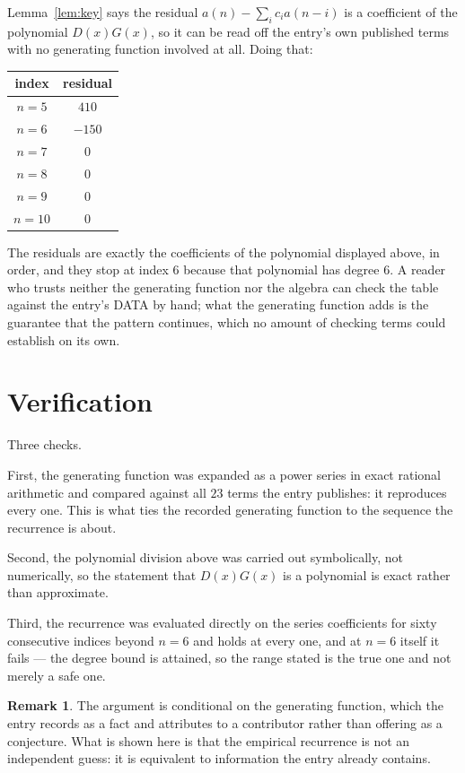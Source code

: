 \documentclass[11pt,a4paper]{article}
\theoremstyle{plain}
\theoremstyle{definition}
\newtheorem{remark}[theorem]{Remark}
\begin{document}
Lemma~\ref{lem:key} says the residual $a(n)-\sum_ic_ia(n-i)$ is a coefficient of the
polynomial $D(x)G(x)$, so it can be read off the entry's own published terms with no
generating function involved at all. Doing that:
\begin{center}
\begin{tabular}{cc}
index & residual \\ \hline
$n=5$ & $410$ \\
$n=6$ & $-150$ \\
$n=7$ & $0$ \\
$n=8$ & $0$ \\
$n=9$ & $0$ \\
$n=10$ & $0$
\end{tabular}
\end{center}
The residuals are exactly the coefficients of the polynomial displayed above, in order, and
they stop at index $6$ because that polynomial has degree $6$. A reader who trusts
neither the generating function nor the algebra can check the table against the entry's DATA
by hand; what the generating function adds is the guarantee that the pattern continues, which
no amount of checking terms could establish on its own.

\section{Verification}

Three checks.

First, the generating function was expanded as a power series in exact rational arithmetic and
compared against all $23$ terms the entry publishes: it reproduces every one. This is
what ties the recorded generating function to the sequence the recurrence is about.

Second, the polynomial division above was carried out symbolically, not numerically, so the
statement that $D(x)G(x)$ is a polynomial is exact rather than approximate.

Third, the recurrence was evaluated directly on the series coefficients for sixty consecutive
indices beyond $n=6$ and holds at every one, and at $n=6$ itself it fails --- the
degree bound is attained, so the range stated is the true one and not merely a safe one.

\begin{remark}
The argument is conditional on the generating function, which the entry records as a fact and
attributes to a contributor rather than offering as a conjecture. What is shown here is that
the empirical recurrence is not an independent guess: it is equivalent to information the
entry already contains.
\end{remark}
\end{document}
